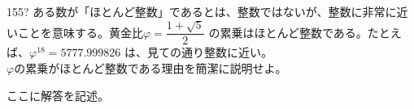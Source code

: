 \begin{thm}{155}{\hosi ?}{}
 ある数が「ほとんど整数」であるとは、整数ではないが、整数に非常に近いことを意味する。黄金比$\varphi=\dfrac{1+\sqrt{5}}{2}$ の累乗はほとんど整数である。たとえば、$\varphi^{18}=5777.999826$ は、見ての通り整数に近い。 \\
 $\varphi$の累乗がほとんど整数である理由を簡潔に説明せよ。
\end{thm}

ここに解答を記述。